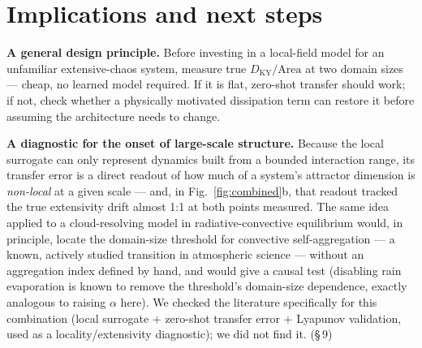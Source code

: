\documentclass[11pt]{article}
\newcommand{\DKY}{D_{\mathrm{KY}}}
\begin{document}
\section{Implications and next steps}

\textbf{A general design principle.} Before investing in a local-field
model for an unfamiliar extensive-chaos system, measure true
$\DKY/\mathrm{Area}$ at two domain sizes --- cheap, no learned model
required. If it is flat, zero-shot transfer should work; if not, check
whether a physically motivated dissipation term can restore it before
assuming the architecture needs to change.

\textbf{A diagnostic for the onset of large-scale structure.} Because
the local surrogate can only represent dynamics built from a bounded
interaction range, its transfer error is a direct readout of how much of
a system's attractor dimension is \emph{non-local} at a given scale ---
and, in Fig.~\ref{fig:combined}b, that readout tracked the true extensivity drift almost
1:1 at both points measured. The same idea applied to a cloud-resolving
model in radiative-convective equilibrium would, in principle, locate
the domain-size threshold for convective self-aggregation --- a known,
actively studied transition in atmospheric science --- without an
aggregation index defined by hand, and would give a causal test
(disabling rain evaporation is known to remove the threshold's
domain-size dependence, exactly analogous to raising $\alpha$ here).
We checked the literature specifically for this combination (local
surrogate + zero-shot transfer error + Lyapunov validation, used as a
locality/extensivity diagnostic); we did not find it. (\S\,9)
\end{document}
